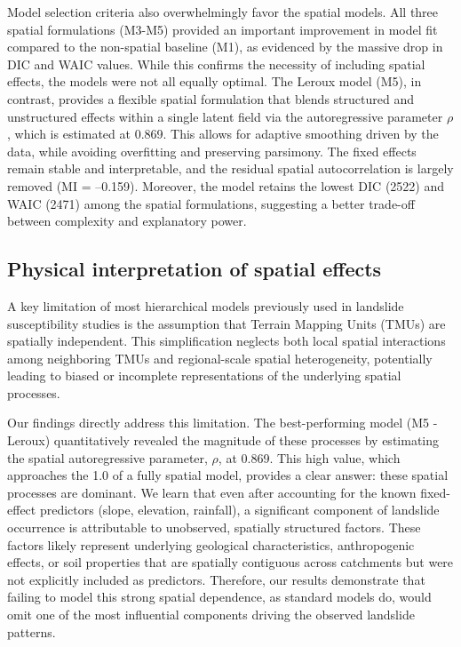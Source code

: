 \documentclass[journal abbreviation, manuscript]{copernicus}
\begin{document}
Model selection criteria also overwhelmingly favor the spatial models. All three spatial formulations (M3-M5) provided an important improvement in model fit compared to the non-spatial baseline (M1), as evidenced by the massive drop in DIC and WAIC values. While this confirms the necessity of including spatial effects, the models were not all equally optimal. The Leroux model (M5), in contrast, provides a flexible spatial formulation that blends structured and unstructured effects within a single latent field via the autoregressive parameter $\rho$, which is estimated at 0.869. This allows for adaptive smoothing driven by the data, while avoiding overfitting and preserving parsimony. The fixed effects remain stable and interpretable, and the residual spatial autocorrelation is largely removed (MI = –0.159). Moreover, the model retains the lowest DIC (2522) and WAIC (2471) among the spatial formulations, suggesting a better trade-off between complexity and explanatory power.

\subsection{Physical interpretation of spatial effects}\label{subsec52}

A key limitation of most hierarchical models previously used in landslide susceptibility studies is the assumption that Terrain Mapping Units (TMUs) are spatially independent. This simplification neglects both local spatial interactions among neighboring TMUs and regional-scale spatial heterogeneity, potentially leading to biased or incomplete representations of the underlying spatial processes.

Our findings directly address this limitation. The best-performing model (M5 - Leroux) quantitatively revealed the magnitude of these processes by estimating the spatial autoregressive parameter, $\rho$, at 0.869. This high value, which approaches the 1.0 of a fully spatial model, provides a clear answer: these spatial processes are dominant. We learn that even after accounting for the known fixed-effect predictors (slope, elevation, rainfall), a significant component of landslide occurrence is attributable to unobserved, spatially structured factors. These factors likely represent underlying geological characteristics, anthropogenic effects, or soil properties that are spatially contiguous across catchments but were not explicitly included as predictors. Therefore, our results demonstrate that failing to model this strong spatial dependence, as standard models do, would omit one of the most influential components driving the observed landslide patterns.
\end{document}
